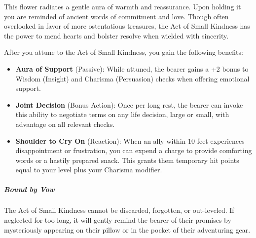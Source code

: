 \documentclass[10pt,a5paper,twoside,bg=none,onecolumn,openany,nodeprecatedcode]{dndbook}
\begin{document}
\mainmatter


This flower radiates a gentle aura of warmth and reassurance. Upon holding it you are reminded of ancient words of commitment and love. Though often overlooked in favor of more ostentatious treasures, the Act of Small Kindness has the power to mend hearts and bolster resolve when wielded with sincerity.

After you attune to the Act of Small Kindness, you gain the following benefits:

\begin{itemize}
    \item \textbf{Aura of Support} (Passive): While attuned, the bearer gains a +2 bonus to Wisdom (Insight) and Charisma (Persuasion) checks when offering emotional support.
    \item \textbf{Joint Decision} (Bonus Action): Once per long rest, the bearer can invoke this ability to negotiate terms on any life decision, large or small, with advantage on all relevant checks.
	\item \textbf{Shoulder to Cry On} (Reaction): When an ally within 10 feet experiences disappointment or frustration, you can expend a charge to provide comforting words or a hastily prepared snack. This grants them temporary hit points equal to your level plus your Charisma modifier.
\end{itemize}

\subparagraph{Bound by Vow}

The Act of Small Kindness cannot be discarded, forgotten, or out-leveled. If neglected for too long, it will gently remind the bearer of their promises by mysteriously appearing on their pillow or in the pocket of their adventuring gear.
\end{document}

